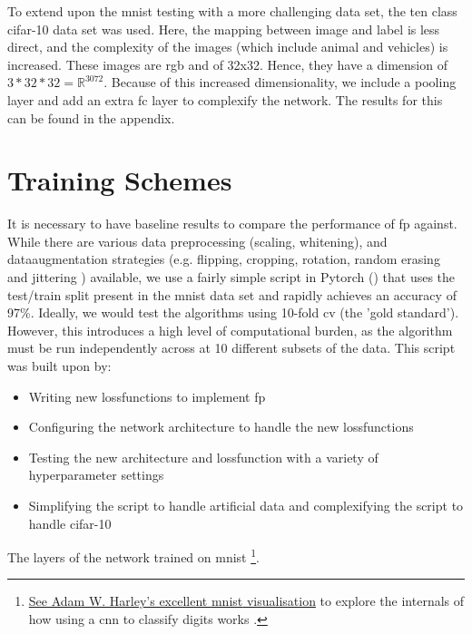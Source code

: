 To extend upon the \gls{mnist} testing with a more challenging data set, the ten class \gls{cifar}-10 data set was used. Here, the mapping between image and label is less direct, and the complexity of the images (which include animal and vehicles) is increased. These images are \gls{rgb} and of 32x32. Hence, they have a dimension of $3 * 32 * 32 = \mathds{R}^{3072}$. Because of this increased dimensionality, we include a pooling layer and add an extra \gls{fc} layer to complexify the network. The results for this can be found in the appendix.
\bigskip

%

\section{Training Schemes}
It is necessary to have baseline results to compare the performance of \gls{fp} against. While there are various data preprocessing (scaling, whitening), and \gls{dataaugmentation} strategies (e.g. flipping, cropping, rotation, random erasing and jittering \cite{data_aug_survey}) available, we use a fairly simple script in Pytorch (\cite{mnist_script}) that uses the test/train split present in the  \gls{mnist} data set and rapidly achieves an accuracy of 97\%. Ideally, we would test the algorithms using 10-fold \gls{cv} (the 'gold standard'). However, this introduces a high level of computational burden, as the algorithm must be run independently across at 10 different subsets of the data. This script was built upon by:

\begin{itemize}
    \item Writing new \gls{lossfunction}s to implement \gls{fp}
    \item Configuring the network architecture to handle the new \gls{lossfunction}s
    \item Testing the new architecture and \gls{lossfunction} with a variety of \gls{hyperparameter} settings
    \item Simplifying the script to handle artificial data and complexifying the script to handle \gls{cifar}-10
\end{itemize}

The layers of the network trained on \gls{mnist} \footnote{\href{https://www.cs.ryerson.ca/~aharley/vis/conv/}{See Adam W. Harley's excellent \gls{mnist} visualisation} to explore the internals of how using a \gls{cnn} to classify digits works \cite{mnist_viz}.}. 


